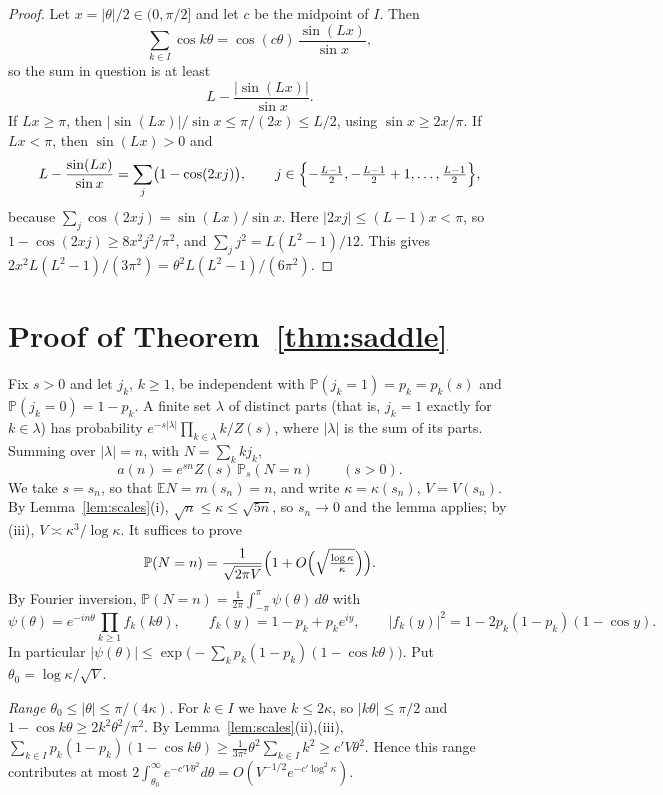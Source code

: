 \documentclass[11pt,a4paper]{article}
\theoremstyle{remark}
\begin{document}
\begin{proof}
Let $x=|\theta|/2\in(0,\pi/2]$ and let $c$ be the midpoint of $I$. Then
\[
 \sum_{k\in I}\cos k\theta=\cos(c\theta)\,\frac{\sin(Lx)}{\sin x},
\]
so the sum in question is at least
\[
 L-\frac{|\sin(Lx)|}{\sin x}.
\]
 If $Lx\ge\pi$, then $|\sin(Lx)|/\sin x\le\pi/(2x)\le L/2$, using $\sin x\ge2x/\pi$. If $Lx<\pi$, then $\sin(Lx)>0$ and
\[
 L-\frac{\sin(Lx)}{\sin x}=\sum_j\bigl(1-\cos(2xj)\bigr),\qquad j\in\Bigl\{-\tfrac{L-1}2,-\tfrac{L-1}2+1,\dots,\tfrac{L-1}2\Bigr\},
\]
because $\sum_j\cos(2xj)=\sin(Lx)/\sin x$. Here $|2xj|\le(L-1)x<\pi$, so $1-\cos(2xj)\ge8x^2j^2/\pi^2$, and $\sum_jj^2=L(L^2-1)/12$. This gives $2x^2L(L^2-1)/(3\pi^2)=\theta^2L(L^2-1)/(6\pi^2)$.
\end{proof}

\section{Proof of Theorem~\ref{thm:saddle}}\label{sec:saddle}

Fix $s>0$ and let $j_k$, $k\ge1$, be independent with $\mathbb P(j_k=1)=p_k=p_k(s)$ and $\mathbb P(j_k=0)=1-p_k$. A finite set $\lambda$ of distinct parts (that is, $j_k=1$ exactly for $k\in\lambda$) has probability $e^{-s|\lambda|}\prod_{k\in\lambda}k/Z(s)$, where $|\lambda|$ is the sum of its parts. Summing over $|\lambda|=n$, with $N=\sum_kkj_k$,
\[
 a(n)=e^{sn}Z(s)\,\mathbb P_s(N=n)\qquad(s>0).
\]
We take $s=s_n$, so that $\mathbb E N=m(s_n)=n$, and write $\kappa=\kappa(s_n)$, $V=V(s_n)$. By Lemma~\ref{lem:scales}(i), $\sqrt n\le\kappa\le\sqrt{5n}$, so $s_n\to0$ and the lemma applies; by (iii), $V\asymp\kappa^3/\log\kappa$. It suffices to prove
\[
 \mathbb P(N=n)=\frac{1}{\sqrt{2\pi V}}\Bigl(1+O\Bigl(\sqrt{\tfrac{\log\kappa}{\kappa}}\Bigr)\Bigr).
\]
By Fourier inversion, $\mathbb P(N=n)=\frac1{2\pi}\int_{-\pi}^{\pi}\psi(\theta)\,d\theta$ with
\[
 \psi(\theta)=e^{-in\theta}\prod_{k\ge1}f_k(k\theta),\qquad f_k(y)=1-p_k+p_ke^{iy},\qquad |f_k(y)|^2=1-2p_k(1-p_k)(1-\cos y).
\]
In particular $|\psi(\theta)|\le\exp\bigl(-\sum_kp_k(1-p_k)(1-\cos k\theta)\bigr)$. Put $\theta_0=\log\kappa/\sqrt V$.

\emph{Range $\theta_0\le|\theta|\le\pi/(4\kappa)$.} For $k\in I$ we have $k\le2\kappa$, so $|k\theta|\le\pi/2$ and $1-\cos k\theta\ge2k^2\theta^2/\pi^2$. By Lemma~\ref{lem:scales}(ii),(iii), $\sum_{k\in I}p_k(1-p_k)(1-\cos k\theta)\ge\frac{1}{3\pi^2}\theta^2\sum_{k\in I}k^2\ge c'V\theta^2$. Hence this range contributes at most $2\int_{\theta_0}^\infty e^{-c'V\theta^2}d\theta=O(V^{-1/2}e^{-c'\log^2\kappa})$.
\end{document}
